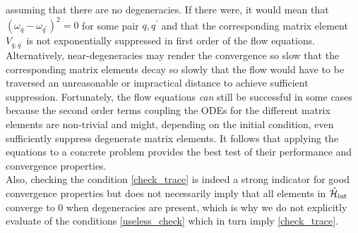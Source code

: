 assuming that there are no degeneracies. If there were, it would mean that  $(\omega_q-\omega_{q^\prime})^2=0$ for some pair $q,q^\prime$ and that the corresponding matrix element $V_{q,q^\prime}$ is not exponentially suppressed in first order of the flow equations. Alternatively, near-degeneracies may render the convergence so slow that the corresponding matrix elements decay so slowly that the flow would have to be traversed an unreasonable or impractical distance to achieve sufficient suppression.  Fortunately, the flow equations \emph{can} still be successful in some cases \cite{PhysRevD.49.4214} because the second order terms coupling the ODEs for the different matrix elements are non-trivial and might, depending on the initial condition, even sufficiently suppress degenerate matrix elements.
It follows that applying the equations to a concrete problem provides the best test of their performance and convergence properties.\\
Also, checking the condition \ref{check_trace} is indeed a strong indicator for good convergence properties but does not necessarily imply that all elements in $\hat{\mathcal{H}}_{\mathrm{int}}$ converge to 0 when degeneracies are present, which is why we do not explicitly evaluate of the conditions \ref{useless_check} which in turn imply \ref{check_trace}.
